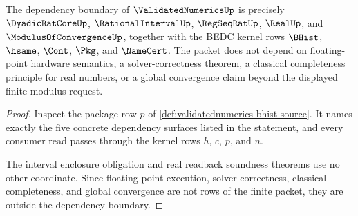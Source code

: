 \begin{theorem}
\label{thm:validatednumerics-dependency-boundary}
The dependency boundary of $\ValidatedNumericsUp$ is precisely
$\DyadicRatCoreUp$, $\RationalIntervalUp$, $\RegSeqRatUp$, $\RealUp$, and
$\ModulusOfConvergenceUp$, together with the BEDC kernel rows
$\BHist$, $\hsame$, $\Cont$, $\Pkg$, and $\NameCert$. The packet does not
depend on floating-point hardware semantics, a solver-correctness theorem, a
classical completeness principle for real numbers, or a global convergence
claim beyond the displayed finite modulus request.
\end{theorem}
\begin{proof}
Inspect the package row $p$ of
\autoref{def:validatednumerics-bhist-source}. It names exactly the five
concrete dependency surfaces listed in the statement, and every consumer read
passes through the kernel rows $h$, $c$, $p$, and $n$.

The interval enclosure obligation and real readback soundness theorems use no
other coordinate. Since floating-point execution, solver correctness,
classical completeness, and global convergence are not rows of the finite
packet, they are outside the dependency boundary.
\end{proof}


